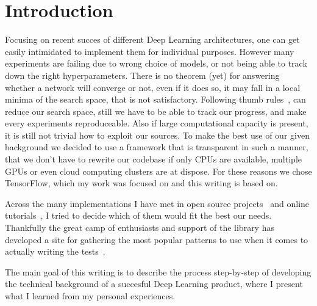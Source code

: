 \section{Introduction}

Focusing on recent succes of different Deep Learning architectures, one can get easily intimidated to implement them for individual purposes.
However many experiments are failing due to wrong choice of models, or not being able to track down the right hyperparameters.
There is no theorem (yet) for answering whether a network will converge or not, even if it does so, it may fall in a local minima of the search space, that is not satisfactory.
Following thumb rules~\cite{thumbrules?}, can reduce our search space, still we have to be able to track our progress, and make every experiments reproduceable.
Also if large computational capacity is present, it is still not trivial how to exploit our sources. To make the best use of our given background we decided to use a framework that is transparent in such a manner, that we don't have to rewrite our codebase if only CPUs are available, multiple GPUs or even cloud computing clusters are at dispose. For these reasons we chose TensorFlow, which my work was focused on and this writing is based on.

Across the many implementations I have met in open source projects~\cite{OSS?} and online tutorials~\cite{wildml - metaflow - etc}, I tried to decide which of them would fit the best our needs.
Thankfully the great camp of enthusiasts and support of the library has developed a site for gathering the most popular patterns to use when it comes to actually writing the tests~\cite{tensorflow-patterns}.

The main goal of this writing is to describe the process step-by-step of developing the technical background of a succesful Deep Learning product, where I present what I learned from my personal experiences.
